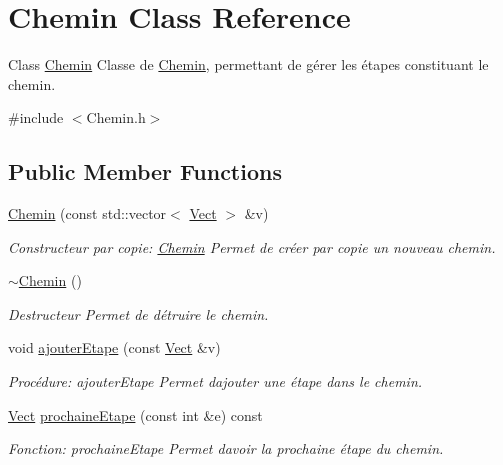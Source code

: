 \hypertarget{classChemin}{}\section{Chemin Class Reference}
\label{classChemin}


Class \hyperlink{classChemin}{Chemin} Classe de \hyperlink{classChemin}{Chemin}, permettant de gérer les étapes constituant le chemin.  




{\ttfamily \#include $<$Chemin.\+h$>$}

\subsection*{Public Member Functions}
\begin{DoxyCompactItemize}
\item 
\hyperlink{classChemin_acbb44d2dd9c7eda79740c3ddb2b435c5}{Chemin} (const std\+::vector$<$ \hyperlink{classVect}{Vect} $>$ \&v)
\begin{DoxyCompactList}\small\item\em Constructeur par copie\+: \hyperlink{classChemin}{Chemin} Permet de créer par copie un nouveau chemin. \end{DoxyCompactList}\item 
\mbox{\label{classChemin_a0024ec1de3487b44a51c095aca1b83dc}} 
\hyperlink{classChemin_a0024ec1de3487b44a51c095aca1b83dc}{$\sim$\+Chemin} ()
\begin{DoxyCompactList}\small\item\em Destructeur Permet de détruire le chemin. \end{DoxyCompactList}\item 
void \hyperlink{classChemin_a4cdbe032bca015c52dccbef4fa2cb647}{ajouter\+Etape} (const \hyperlink{classVect}{Vect} \&v)
\begin{DoxyCompactList}\small\item\em Procédure\+: ajouter\+Etape Permet d\textquotesingle{}ajouter une étape dans le chemin. \end{DoxyCompactList}\item 
\hyperlink{classVect}{Vect} \hyperlink{classChemin_ad01a7ae60fd0b51cc18281c031ea9c97}{prochaine\+Etape} (const int \&e) const
\begin{DoxyCompactList}\small\item\em Fonction\+: prochaine\+Etape Permet d\textquotesingle{}avoir la prochaine étape du chemin. \end{DoxyCompactList}\item 

\end{DoxyCompactItemize}
